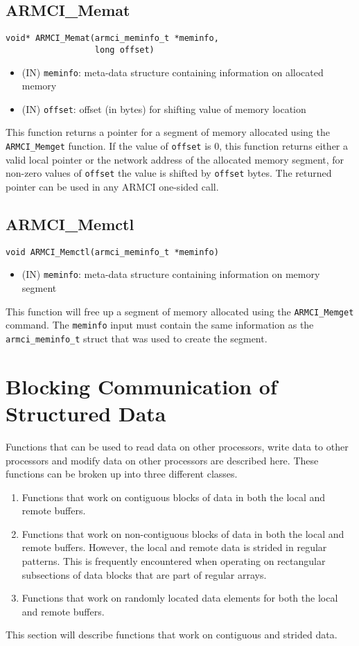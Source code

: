 \documentclass[12pt]{article}
\begin{document}
\subsection{ARMCI\_Memat}
\begin{verbatim}
void* ARMCI_Memat(armci_meminfo_t *meminfo,
                  long offset)
\end{verbatim}
\begin{itemize}
\item (IN) \texttt{meminfo}: meta-data structure containing information on
allocated memory
\item (IN) \texttt{offset}: offset (in bytes) for shifting value of memory
location
\end{itemize}
This function returns a pointer for a segment of memory allocated using the
\texttt{ARMCI\_Memget} function. If the value of \texttt{offset} is 0, this function
returns either a valid local pointer or the network address of the allocated
memory segment, for non-zero values of \texttt{offset} the value is shifted by
\texttt{offset} bytes. The returned pointer can be used in any ARMCI one-sided
call.

\subsection{ARMCI\_Memctl}
\begin{verbatim}
void ARMCI_Memctl(armci_meminfo_t *meminfo)
\end{verbatim}
\begin{itemize}
\item (IN) \texttt{meminfo}: meta-data structure containing information on
memory segment
\end{itemize}
This function will free up a segment of memory allocated using the
\texttt{ARMCI\_Memget}
command. The \texttt{meminfo} input must contain the same information as the
\texttt{armci\_meminfo\_t} struct that was used to create the segment.

\section{Blocking Communication of Structured Data}
Functions that can be used to read data on other processors, write data to other
processors and modify data on other processors are described here. These
functions can be broken up into three different classes.
\begin{enumerate}
\item Functions that work on contiguous blocks of data in both the local and
remote buffers.
\item Functions that work on non-contiguous blocks of data in both the local and
remote buffers. However, the local and remote data is strided in regular
patterns. This is frequently encountered when operating on rectangular
subsections of data blocks that are part of regular arrays.
\item Functions that work on randomly located data elements for both the local
and remote buffers.
\end{enumerate}
This section will describe functions that work on contiguous and strided data.
\end{document}
